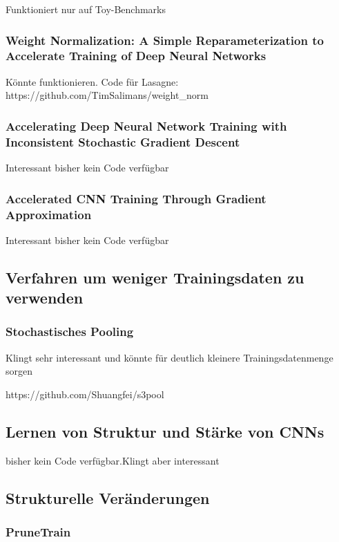 Funktioniert nur auf Toy-Benchmarks


\subsubsection{Weight Normalization: A Simple Reparameterization
to Accelerate Training of Deep Neural Networks}


Könnte funktionieren. Code für Lasagne: https://github.com/TimSalimans/weight_norm


\subsubsection{Accelerating Deep Neural Network Training with Inconsistent Stochastic Gradient Descent}

Interessant bisher kein Code verfügbar


\subsubsection{Accelerated CNN Training Through Gradient Approximation }

Interessant bisher kein Code verfügbar




\subsection{Verfahren um weniger Trainingsdaten zu verwenden}


\subsubsection{Stochastisches Pooling}

Klingt sehr interessant und könnte für deutlich kleinere Trainingsdatenmenge sorgen

https://github.com/Shuangfei/s3pool


\subsection{Lernen von Struktur und Stärke von CNNs}

bisher kein Code verfügbar.Klingt aber interessant


\subsection{Strukturelle Veränderungen}


\subsubsection{PruneTrain}

